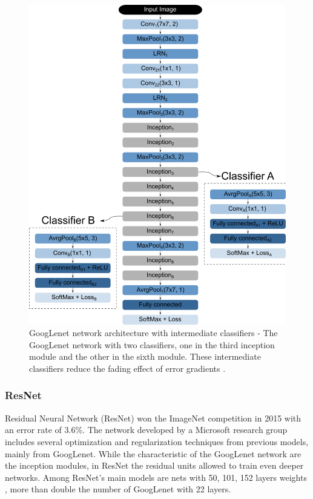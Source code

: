 \begin{figure}
    \centering
    \includegraphics[scale=0.4]{Part 3 - Learning Systems/Supervised Learning/Deep Learning/images/figure134.png}
    \caption{GoogLenet network architecture with intermediate classifiers - The GoogLenet network with two classifiers, one in the third inception module and the other in the sixth module. These intermediate classifiers reduce the fading effect of error gradients \cite{img:googlenet}.}
    \label{fig:googlenet2}
\end{figure}

\subsubsection{ResNet}
Residual Neural Network (ResNet) won the ImageNet competition in 2015 with an error rate of 3.6\%. The network developed by a Microsoft research group includes several optimization and regularization techniques from previous models, mainly from GoogLenet. While the characteristic of the GoogLenet network are the inception modules, in ResNet the residual units allowed to train even deeper networks. Among ResNet's main models are nets with 50, 101, 152 layers weights \cite{elgendy2020}, more than double the number of GoogLenet with 22 layers.

